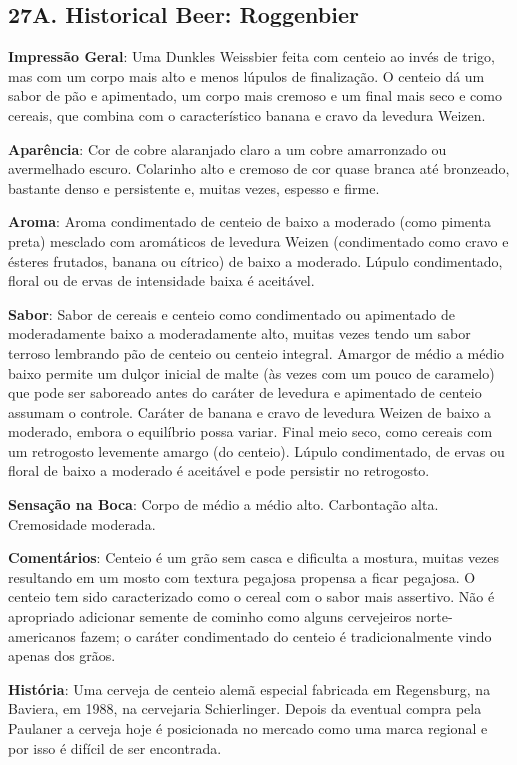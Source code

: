 \subsection*{27A. Historical Beer: Roggenbier}

\textbf{Impressão Geral}: Uma Dunkles Weissbier feita com centeio ao invés de trigo, mas com um corpo mais alto e menos lúpulos de finalização. O centeio dá um sabor de pão e apimentado, um corpo mais cremoso e um final mais seco e como cereais, que combina com o característico banana e cravo da levedura Weizen.

\textbf{Aparência}: Cor de cobre alaranjado claro a um cobre amarronzado ou avermelhado escuro. Colarinho alto e cremoso de cor quase branca até bronzeado, bastante denso e persistente e, muitas vezes, espesso e firme.

\textbf{Aroma}: Aroma condimentado de centeio de baixo a moderado (como pimenta preta) mesclado com aromáticos de levedura Weizen (condimentado como cravo e ésteres frutados, banana ou cítrico) de baixo a moderado. Lúpulo condimentado, floral ou de ervas de intensidade baixa é aceitável.

\textbf{Sabor}: Sabor de cereais e centeio como condimentado ou apimentado de moderadamente baixo a moderadamente alto, muitas vezes tendo um sabor terroso lembrando pão de centeio ou centeio integral. Amargor de médio a médio baixo permite um dulçor inicial de malte (às vezes com um pouco de caramelo) que pode ser saboreado antes do caráter de levedura e apimentado de centeio assumam o controle. Caráter de banana e cravo de levedura Weizen de baixo a moderado, embora o equilíbrio possa variar. Final meio seco, como cereais com um retrogosto levemente amargo (do centeio). Lúpulo condimentado, de ervas ou floral de baixo a moderado é aceitável e pode persistir no retrogosto.

\textbf{Sensação na Boca}: Corpo de médio a médio alto. Carbontação alta. Cremosidade moderada.

\textbf{Comentários}: Centeio é um grão sem casca e dificulta a mostura, muitas vezes resultando em um mosto com textura pegajosa propensa a ficar pegajosa. O centeio tem sido caracterizado como o cereal com o sabor mais assertivo. Não é apropriado adicionar semente de cominho como alguns cervejeiros norte-americanos fazem; o caráter condimentado do centeio é tradicionalmente vindo apenas dos grãos.

\textbf{História}: Uma cerveja de centeio alemã especial fabricada em Regensburg, na Baviera, em 1988, na cervejaria Schierlinger. Depois da eventual compra pela Paulaner a cerveja hoje é posicionada no mercado como uma marca regional e por isso é difícil de ser encontrada.

